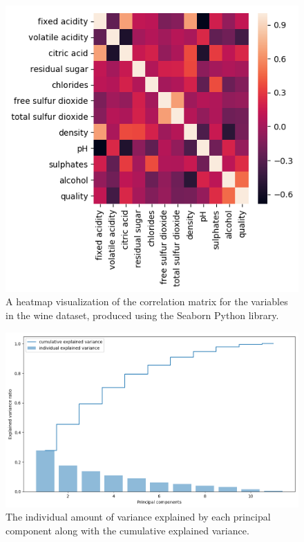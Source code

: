 \documentclass[12pt,preprint]{aastex61}
\begin{document}
 \begin{figure}
 \centering 
 \includegraphics[angle=0,width=130mm]{../output/feature_heatMap.png}
 \caption{
   A heatmap visualization of the correlation matrix for the variables in the wine dataset,
   produced using the Seaborn Python library.
 \label{FIG-HeatMap}}
 \end{figure}

 \begin{figure}
 \centering 
 \includegraphics[angle=0,width=130mm]{../output/explainedVariance.png}
 \caption{
   The individual amount of variance explained by each principal component along
   with the cumulative explained variance.
 \label{FIG-Explained-Variance}}
 \end{figure}
\end{document}
